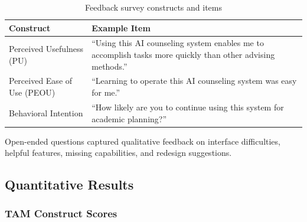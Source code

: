 \documentclass[letterpaper,11pt]{article}
\begin{document}
\begin{table}[htbp]
\centering
\caption{Feedback survey constructs and items}
\label{tab:constructs}
\begin{tabular}{@{}lp{8cm}@{}}
\toprule
\textbf{Construct} & \textbf{Example Item} \\
\midrule
Perceived Usefulness (PU) & ``Using this AI counseling system enables me to accomplish tasks more quickly than other advising methods.'' \\
Perceived Ease of Use (PEOU) & ``Learning to operate this AI counseling system was easy for me.'' \\
Behavioral Intention & ``How likely are you to continue using this system for academic planning?'' \\
\bottomrule
\end{tabular}
\end{table}

Open-ended questions captured qualitative feedback on interface difficulties, helpful features, missing capabilities, and redesign suggestions.

\subsection{Quantitative Results}\label{subsec:quantresults}

\subsubsection{TAM Construct Scores}
\end{document}
